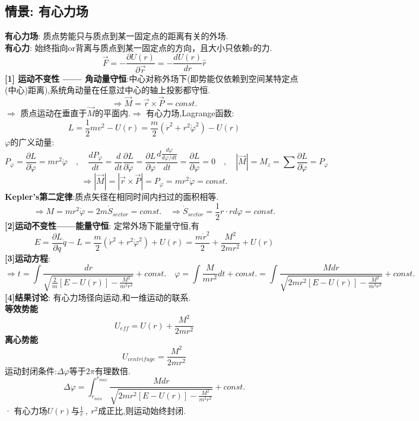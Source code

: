 \documentclass{article}
\begin{document}
\subsection{情景: 有心力场}
\textbf{有心力场}: 质点势能只与质点到某一固定点的距离有关的外场.\\
\textbf{有心力}: 始终指向or背离与质点到某一固定点的方向，且大小只依赖r的力.
$$\vec F = -\frac{\partial U(r)}{\partial \vec r} = -\frac{d U(r)}{d r} \hat r$$
\textbf{[1] 运动不变性 —— 角动量守恒}:中心对称外场下(即势能仅依赖到空间某特定点(中心)距离),系统角动量在任意过中心的轴上投影都守恒.
$$\Rightarrow \vec M = \vec r \times \vec P = const.$$
$\Rightarrow$ 质点运动在垂直于$\vec M$的平面内.\quad $\Rightarrow$ 有心力场,Lagrange函数:
$$L = \frac{1}{2}m v^2 - U(r) = \frac{m}{2} (\dot r^2 + r^2 \dot \varphi ^2) - U(r)$$
$\varphi$的广义动量:
$$P_\varphi = \frac{\partial L}{\partial \dot \varphi} = m r^2 \dot \varphi \quad , \quad \frac{d P_\varphi}{d t} = \frac{d}{d t}\frac{\partial L}{\partial \dot \varphi} = \frac{\partial L}{\partial \varphi} \frac{d \frac{d \varphi}{d \varphi / d t}}{d t} = \frac{\partial L}{\partial \varphi} = 0 \quad , \quad |\vec M| = M_z = \sum \frac{\partial L}{\partial  \dot \varphi} = P_\varphi$$
$$\Rightarrow |\vec M| =| \vec r \times \vec P |= P_\varphi = m r^2 \dot \varphi = const.$$
\textbf{Kepler's第二定律}:质点矢径在相同时间内扫过的面积相等.
$$\Rightarrow M = m r^2 \dot \varphi = 2 m \dot S_{sector} = const.\quad \Rightarrow \dot S_{sector} = \frac{1}{2} r \cdot r d\varphi = const.$$
\textbf{[2]运动不变性——能量守恒}: 定常外场下能量守恒,有
$$E = \frac{\partial L}{\partial \dot q}\dot q - L = \frac{m}{2} (\dot r^2 + r^2 \dot \varphi ^2) + U(r) = \frac{m \dot r^2}{2} + \frac{M^2}{2mr^2} + U(r)$$
\textbf{[3]运动方程}:
$$\Rightarrow t = \int \frac{d r}{\sqrt{\frac{2}{m}[E-U(r)] - \frac{M^2}{m^2 r^2}}} + const. \quad \varphi = \int \frac{M}{m r^2} d t  + const.= \int \frac{M dr}{\sqrt{2mr^2 [E-U(r)] - \frac{M^2}{m^2 r^2}}} + const.$$
\textbf{[4]结果讨论}: 有心力场径向运动,和一维运动的联系.\\
\textbf{等效势能}
$$U_{eff} = U(r) + \frac{M^2}{2mr^2}$$
\textbf{离心势能}
$$U_{centrifuge} = \frac{M^2}{2mr^2}$$
运动封闭条件:$\Delta \varphi$等于$2\pi$有理数倍.
$$\Delta \varphi = \int_{r_{min}} ^{r_{max}} \frac{M dr}{\sqrt{2mr^2 [E-U(r)] - \frac{M^2}{m^2 r^2}}} + const.$$
· 有心力场$U(r)$与$\frac{1}{r}\ ,\ r^2$成正比,则运动始终封闭.
\end{document}
